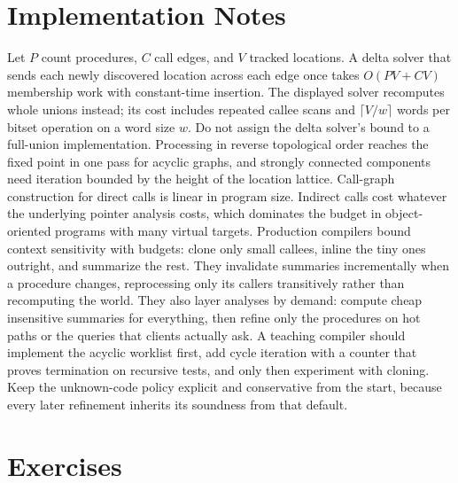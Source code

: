 \section{Implementation Notes}
\label{sec:ch22-implementation}

Let $P$ count procedures, $C$ call edges, and $V$ tracked locations.
A delta solver that sends each newly discovered location across each edge once takes $O(PV+CV)$ membership work with constant-time insertion.
The displayed solver recomputes whole unions instead; its cost includes repeated callee scans and $\lceil V/w\rceil$ words per bitset operation on a word size $w$.
Do not assign the delta solver's bound to a full-union implementation.
Processing in reverse topological order reaches the fixed point in one pass for acyclic graphs, and strongly connected components need iteration bounded by the height of the location lattice.
Call-graph construction for direct calls is linear in program size.
Indirect calls cost whatever the underlying pointer analysis costs, which dominates the budget in object-oriented programs with many virtual targets.
Production compilers bound context sensitivity with budgets: clone only small callees, inline the tiny ones outright, and summarize the rest.
They invalidate summaries incrementally when a procedure changes, reprocessing only its callers transitively rather than recomputing the world.
They also layer analyses by demand: compute cheap insensitive summaries for everything, then refine only the procedures on hot paths or the queries that clients actually ask.
A teaching compiler should implement the acyclic worklist first, add cycle iteration with a counter that proves termination on recursive tests, and only then experiment with cloning.
Keep the unknown-code policy explicit and conservative from the start, because every later refinement inherits its soundness from that default.

\section{Exercises}
\label{sec:ch22-exercises}

